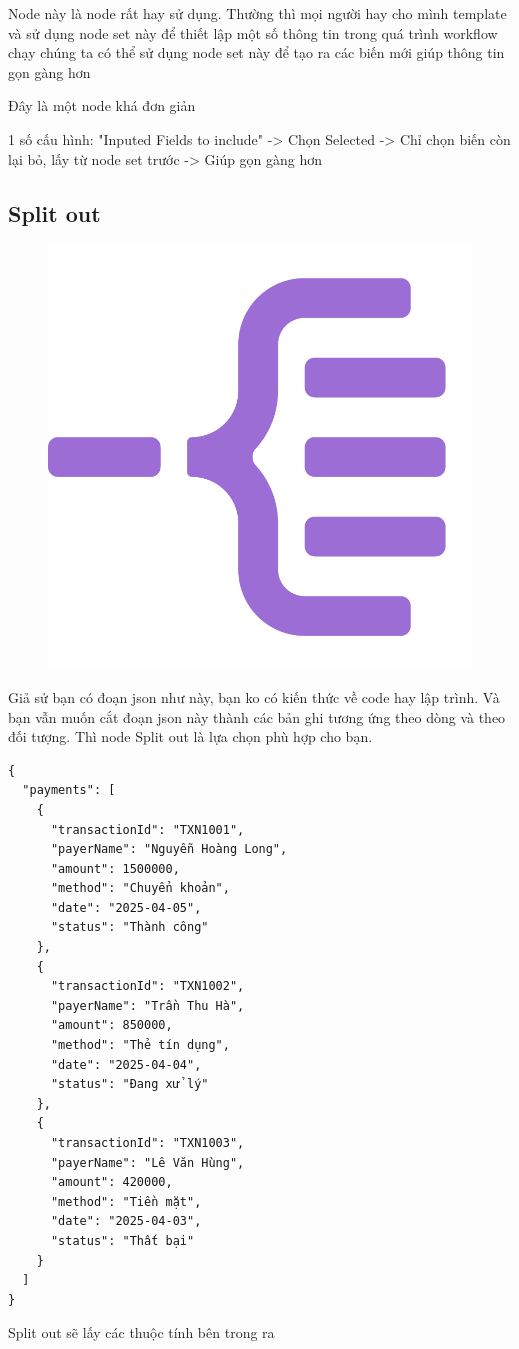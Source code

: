 Node này là node rất hay sử dụng. Thường thì mọi người hay cho mình template và sử dụng node set này để thiết lập một số thông tin trong quá trình workflow chạy chúng ta có thể sử dụng node set này để tạo ra các biến mới giúp thông tin gọn gàng hơn

Đây là một node khá đơn giản


1 số cấu hình: "Inputed Fields to include" -> Chọn Selected -> Chỉ chọn biến còn lại bỏ, lấy từ node set trước -> Giúp gọn gàng hơn


\subsection{Split out}

\begin{figure}[htbp]
    \centering
    \includegraphics[width=0.4\linewidth]{Chap1-7/split-out.pdf}
\end{figure}

Giả sử bạn có đoạn json như này, bạn ko có kiến thức về code hay lập trình. Và bạn vẫn muốn cắt đoạn json này thành các bản ghi tương ứng theo dòng và theo đối tượng. Thì node Split out là lựa chọn phù hợp cho bạn.

\begin{verbatim}
{
  "payments": [
    {
      "transactionId": "TXN1001",
      "payerName": "Nguyễn Hoàng Long",
      "amount": 1500000,
      "method": "Chuyển khoản",
      "date": "2025-04-05",
      "status": "Thành công"
    },
    {
      "transactionId": "TXN1002",
      "payerName": "Trần Thu Hà",
      "amount": 850000,
      "method": "Thẻ tín dụng",
      "date": "2025-04-04",
      "status": "Đang xử lý"
    },
    {
      "transactionId": "TXN1003",
      "payerName": "Lê Văn Hùng",
      "amount": 420000,
      "method": "Tiền mặt",
      "date": "2025-04-03",
      "status": "Thất bại"
    }
  ]
}
\end{verbatim}

Split out sẽ lấy các thuộc tính bên trong ra 

